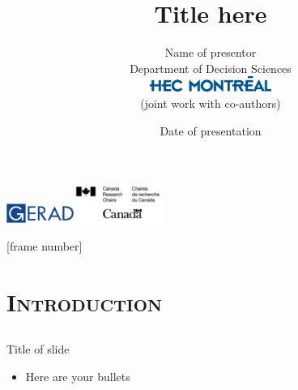\documentclass[xcolor=x11names,compress]{beamer}
\renewcommand{\(}{\begin{columns}}
\renewcommand{\)}{\end{columns}}
\newcommand{\<}[1]{\begin{column}{#1}}
\renewcommand{\>}{\end{column}}
\newcommand{\0}{\V{0}}
\newcommand{\1}{\V{1}}
\begin{document}
\begin{frame}

\centering
\title{Title here}
\subtitle{}
\author{
Name of presentor\\
Department of Decision Sciences\\
\includegraphics[height=0.2in]{HEC_Montreal_541.eps}\\
\vspace{0.5 cm}
	{\small (joint work with co-authors)}\\
}
\date{
	Date of presentation
}
\titlepage
 \includegraphics[height=0.25in]{gerad-vector-logo2.png}\hspace{0.5\textwidth}\includegraphics[height=0.5in]{CRC_logo.png}

\end{frame}
[frame number]



\section[Introduction]{\scshape Introduction}
\subsection[ ]{\scshape  }



\begin{frame}{Title of slide}

\begin{itemize}
\item Here are your bullets
\end{itemize} 


\end{frame}
   
\end{document}
